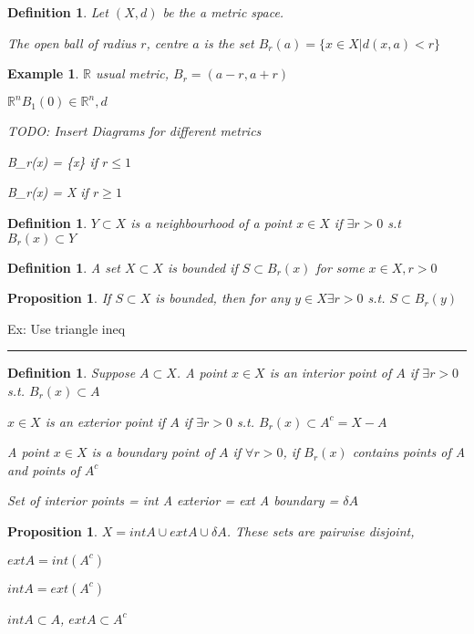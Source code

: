 \documentclass[twoside]{article}
\newtheorem{proposition}[theorem]{Proposition}
\newtheorem{definition}[theorem]{Definition}
\newtheorem{example}[theorem]{Example}
\newenvironment{proof}{{\bf Proof:}}{\hfill\rule{2mm}{2mm}}
\newcommand\R{\mathbb{R}}
\begin{document}
\begin{definition}
    Let $(X,d)$ be the a metric space. 

    The open ball of radius $r$, centre $a$ is the set $B_r(a) = \{x \in X 
    \vert d(x,a) < r\}$
\end{definition}

\begin{example}
    \item $\R$ usual metric, $B_r = (a-r,a+r)$

    \item $\R^n B_1(0) \in \R^n, d $

    TODO: Insert Diagrams for different metrics

    \item B_r(x) = \{x\} if $r \leq 1$

    B_r(x) = X if $r \geq 1$
\end{example}

\begin{definition}
    $Y \subset X$ is a neighbourhood of a point $x \in X$ if $\exists r > 0$ s.t $B_r(x) \subset Y$
\end{definition}

\begin{definition}
    A set $X \subset X$ is bounded if $S \subset B_r(x)$ for some $x 
    \in X, r > 0$
\end{definition}

\begin{proposition}
    If $S \subset X$ is bounded, then for any $y \in X \exists r > 0$ s.t. $S \subset B_r(y)$
\end{proposition}

\begin{proof}
    Ex: Use triangle ineq
\end{proof}

\begin{definition}
    Suppose $A \subset X$. A point $x \in X$ is an interior point of $A$ if $\exists r>0$ s.t. $B_r(x) \subset A$ 

    $x \in X$ is an exterior point if $A$ if $\exists r > 0$ s.t. $B_r (x) \subset A^c = X - A$

    A point $x \in X$ is a boundary point of $A$ if $\forall r > 0$, if $B_r(x)$ contains points of A and points of $A^c$

    Set of interior points = int A 
    exterior = ext A 
    boundary = $\delta A$

\end{definition}

\begin{proposition}
    $X = int A \cup ext A \cup \delta A$. These sets are pairwise disjoint, 

    $ext A = int(A^c)$

    $int A = ext(A^c)$

    $int A \subset A$, $ext A \subset A^c$
\end{proposition}
\end{document}
